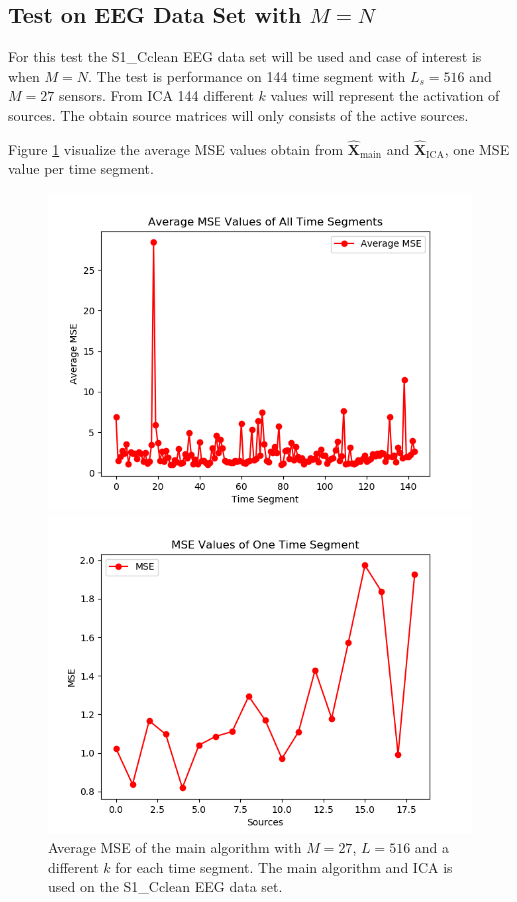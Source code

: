 \subsection{Test on EEG Data Set with $M=N$}
For this test the S1\_Cclean EEG data set will be used and case of interest is when $M = N$. The test is performance on 144 time segment with $L_s = 516$ and $M = 27$ sensors. From ICA 144 different $k$ values will represent the activation of sources. The obtain source matrices will only consists of the active sources.

Figure \ref{fig:M=N_1} visualize the average MSE values obtain from $\hat{\mathbf{X}}_{\text{main}}$ and $\hat{\mathbf{X}}_{\text{ICA}}$, one MSE value per time segment.
\begin{figure}[H]
    \begin{minipage}[t]{.45\textwidth}
		\centering
		\includegraphics[scale=0.5]{figures/ch_7/AveMSE_M=N.png}
	\caption{Average MSE of the main algorithm with $M=27$, $L = 516$ and a different $k$ for each time segment. The main algorithm and ICA is used on the S1\_Cclean EEG data set.}
	\label{fig:M=N_1}
    \end{minipage} 
    \hfill
    \begin{minipage}[t]{.45\textwidth}
        \centering
		\includegraphics[scale=0.5]{figures/ch_7/MSE_M=N.png}

\end{minipage}
\end{figure}
